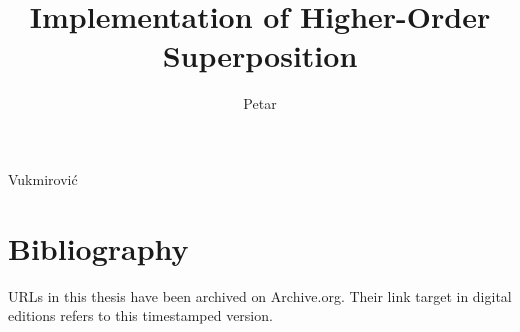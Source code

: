 \documentclass{dissertation}
\begin{document}


\title{Implementation of Higher-Order Superposition}
\author{Petar}{Vukmirović}

\frontmatter




\tableofcontents




\mainmatter

\thumbtrue












%

\thumbfalse

\chapter*{Bibliography}

URLs in this thesis have been archived on Archive.org. Their link target in digital editions refers
to this timestamped version.





\glsaddall
\printglossary[type=\acronymtype,title={Glossary}]


\end{document}
